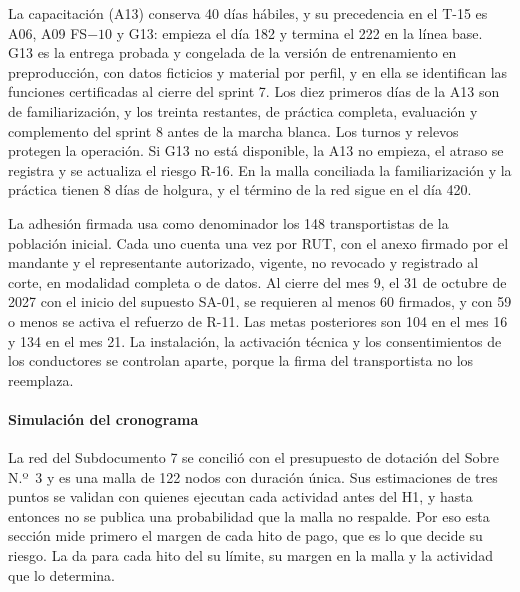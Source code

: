 La capacitación (A13) conserva 40 días hábiles, y su precedencia en el T-15 es A06, A09 FS$-10$ y G13:
empieza el día 182 y termina el 222 en la línea base. G13 es la entrega probada y congelada de la versión
de entrenamiento en preproducción, con datos ficticios y material por perfil, y en ella se identifican
las funciones certificadas al cierre del sprint 7. Los diez primeros días de la A13 son de
familiarización, y los treinta restantes, de práctica completa, evaluación y complemento del sprint 8
antes de la marcha blanca. Los turnos y relevos protegen la operación. Si G13 no está disponible, la A13
no empieza, el atraso se registra y se actualiza el riesgo R-16. En la malla conciliada la familiarización
y la práctica tienen 8 días de holgura, y el término de la red sigue en el día 420.

La adhesión firmada usa como denominador los 148 transportistas de la población inicial. Cada uno cuenta
una vez por RUT, con el anexo firmado por el mandante y el representante autorizado, vigente, no revocado
y registrado al corte, en modalidad completa o de datos. Al cierre del mes 9, el 31 de octubre de 2027
con el inicio del supuesto SA-01, se requieren al menos 60 firmados, y con 59 o menos se activa el
refuerzo de R-11. Las metas posteriores son 104 en el mes 16 y 134 en el mes 21. La instalación, la
activación técnica y los consentimientos de los conductores se controlan aparte, porque la firma del
transportista no los reemplaza.

\paragraph{Simulación del cronograma}
La red del Subdocumento 7 se concilió con el presupuesto de dotación del Sobre N.º~3 y es una malla de
122 nodos con duración única. Sus estimaciones de tres puntos se validan con quienes ejecutan cada
actividad antes del H1, y hasta entonces no se publica una probabilidad que la malla no respalde. Por eso esta sección mide
primero el margen de cada hito de pago, que es lo que decide su riesgo. La  da para
cada hito del  su límite, su margen en la malla y la actividad que lo determina.

